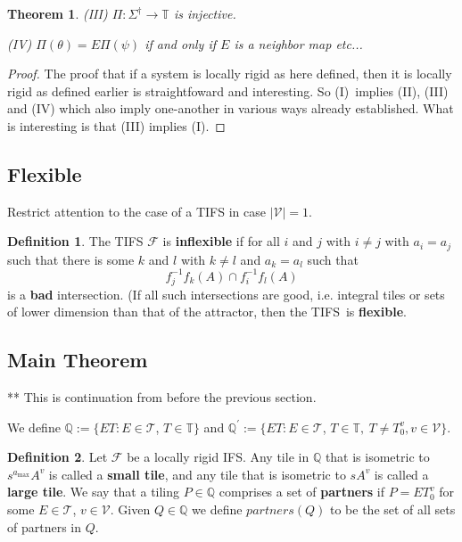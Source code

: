\documentclass{amsproc}
\newtheorem{theorem}{Theorem}
\theoremstyle{plain}
\theoremstyle{definition}
\newtheorem{definition}{Definition}
\numberwithin{equation}{section}
\begin{document}
\begin{newrigid}
\begin{theorem}
(III) $\Pi:\Sigma^{\dag}\rightarrow\mathbb{T}$ is injective.

(IV) $\Pi(\theta)=E\Pi(\psi)$ if and only if $E$ is a neighbor map etc...
\end{theorem}

\begin{proof}
The proof that if a system is locally rigid as here defined, then it is
locally rigid as defined earlier is straightfoward and interesting. So (I)\
implies (II), (III) and (IV) which also imply one-another in various ways
already established. What is interesting is that (III) implies (I).
\end{proof}

\subsection{Flexible}

Restrict attention to the case of a TIFS in case $\left\vert \mathcal{V}%
\right\vert =1$.

\begin{definition}
The TIFS $\mathcal{F}$ is \textbf{inflexible }if for all $i$ and $j$ with $%
i\neq j$ with $a_{i}=a_{j}$ such that there is some $k$ and $l$ with $k\neq
l $ and $a_{k}=a_{l}$ such that 
\begin{equation*}
f_{j}^{-1}f_{k}(A)\cap f_{i}^{-1}f_{l}(A)
\end{equation*}%
is a \textbf{bad} intersection. (If all such intersections are good, i.e.
integral tiles or sets of lower dimension than that of the attractor, then
the TIFS\ is \textbf{flexible}.
\end{definition}

\end{newrigid}

\subsection{Main Theorem}

\begin{newrigid}

** This is continuation from before the previous section.

\end{newrigid}

We define $\mathbb{Q}:=\{ET:E\in\mathcal{T}$, $T\in\mathbb{T\}}$ and $%
\mathbb{Q}^{\prime}:=\{ET:E\in\mathcal{T}$, $T\in\mathbb{T},\mathbb{\ }T\neq
T_{0}^{v},v\in\mathcal{V}\mathbb{\}}$.

\begin{definition}
Let $\mathcal{F}$ be a locally rigid IFS. Any tile in $\mathbb{Q}$ that is
isometric to $s^{a_{\max}}A^{v}$ is called a \textbf{small tile}, and any
tile that is isometric to $sA^{v}$ is called a \textbf{large tile}. We say
that a tiling $P\in\mathbb{Q}$ comprises a set of \textbf{partners }if $%
P=ET_{0}^{v}$ for some $E\in\mathcal{T}$, $v\in\mathcal{V}$. Given $Q\in%
\mathbb{Q}$ we define $partners(Q)$ to be the set of all sets of partners in 
$Q$.
\end{definition}
\end{document}
